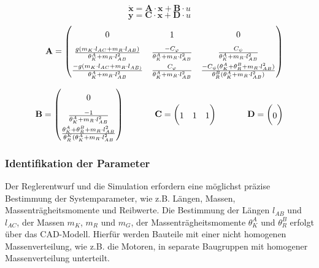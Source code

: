 \begin{equation}
\dot{\textbf{x}} = \textbf{A} \cdot \textbf{x} + \textbf{B} \cdot u
\end{equation}
\begin{equation}
\textbf{y} = \textbf{C} \cdot \textbf{x} + \textbf{D} \cdot u
\end{equation}
\begin{equation}
\setlength{\jot}{10pt}
\begin{split}
\renewcommand*{\arraystretch}{1.7}
\textbf{A} = \begin{pmatrix}
0 & 1 & 0 \\
\frac{g(m_K \cdot l_{AC} + m_R \cdot l_{AB})}{{\theta}^A_K + m_R \cdot l_{AB}^2} &
\frac{-C_{\varphi}}{{\theta}^A_K + m_R \cdot l_{AB}^2} & 
\frac{C_{\psi}}{{\theta}^A_K + m_R \cdot l_{AB}^2} \\
\frac{-g(m_K \cdot l_{AC} + m_R \cdot l_{AB)}}{{\theta}^A_K + m_R \cdot l_{AB}^2} &
\frac{C_{\varphi}}{{\theta}^A_K + m_R \cdot l_{AB}^2} &
\frac{-C_{\psi}({\theta}^A_K + {\theta}^B_R + m_R \cdot l_{AB}^2)}{{\theta}^B_R({\theta}^A_K + m_R \cdot l_{AB}^2)}
\end{pmatrix} 
\\
\renewcommand*{\arraystretch}{1.7}
\textbf{B} = \begin{pmatrix}
0 \\ \frac{-1}{{\theta}^A_K + m_R \cdot l_{AB}^2} \\ \frac{{\theta}^A_K + {\theta}^B_R + m_R \cdot l_{AB}^2}{{\theta}^K_R({\theta}^A_K + m_R \cdot l_{AB}^2}
\end{pmatrix}
\hspace{35 pt}
\textbf{C} = \begin{pmatrix}
1 & 1 & 1
\end{pmatrix}
\hspace{35pt}
\textbf{D} = \begin{pmatrix}
0
\end{pmatrix}
\end{split}
\end{equation}

\subsubsection{Identifikation der Parameter}
Der Reglerentwurf und die Simulation erfordern eine möglichst präzise Bestimmung der Systemparameter, wie z.B. Längen, Massen, Massenträgheitsmomente und Reibwerte. Die Bestimmung der Längen $l_{AB}$ und $l_{AC}$, der Massen $m_K$, $m_R$ und $m_G$, der Massenträgheitsmomente $\theta^A_K$ und $\theta^B_R$ erfolgt über das CAD-Modell. Hierfür werden Bauteile mit einer nicht homogenen Massenverteilung, wie z.B. die Motoren, in separate Baugruppen mit homogener Massenverteilung unterteilt.

